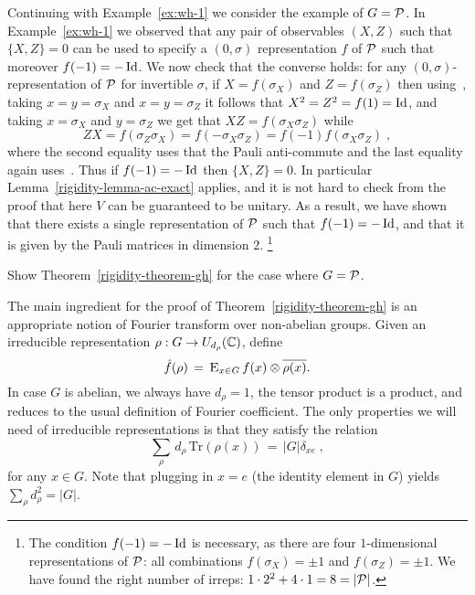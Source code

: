 \begin{example}
\label{ex:wh-3}
Continuing with Example~\ref{ex:wh-1} we consider the example of $G= \mathcal{P}$. In Example~\ref{ex:wh-1} we observed that any pair of observables $(X,Z)$ such that $\{X,Z\}=0$ can be used to specify a $(0,\sigma)$ representation $f$ of $\mathcal{P}$ such that moreover $f(-1)=-\mathop{\rm Id}\nolimits$. We now check that the converse holds: for any $(0,\sigma)$-representation of $\mathcal{P}$ for invertible $\sigma$, if $X=f(\sigma_X)$ and $Z=f(\sigma_Z)$ then using~, taking $x=y=\sigma_X$ and $x=y=\sigma_Z$ it follows that $X^2 = Z^2=f(1)=\mathop{\rm Id}\nolimits$, and taking $x=\sigma_X$ and $y=\sigma_Z$ we get that $XZ=f(\sigma_X \sigma_Z)$ while 
\[ZX=f(\sigma_Z\sigma_X)=f(-\sigma_X\sigma_Z)=f(-1)f(\sigma_X\sigma_Z)\;,\]
where the second equality uses that the Pauli anti-commute and the last equality again uses~. Thus if $f(-1)=-\mathop{\rm Id}\nolimits$ then 
 $\{X,Z\}=0$. In particular Lemma~\ref{rigidity-lemma-ac-exact} applies, and it is not hard to check from the proof that here $V$ can be guaranteed to be unitary. As a result, we have shown that there exists a single  representation of $\mathcal{P}$ such that $f(-1)=-\mathop{\rm Id}\nolimits$, and that it is given by the Pauli matrices in dimension $2$. 
\footnote{The condition $f(-1)=-\mathop{\rm Id}\nolimits$ is necessary, as there are four $1$-dimensional representations of $\mathcal{P}$: all combinations $f(\sigma_X)=\pm 1$ and $f(\sigma_Z)=\pm 1$. We have found the right number of irreps: $1\cdot 2^2 + 4\cdot 1 = 8 = |\mathcal{P}|$.}
\end{example}

\begin{exercise}
Show Theorem~\ref{rigidity-theorem-gh} for the case where $G=\mathcal{P}$. 
\end{exercise}

The main ingredient for the proof of Theorem~\ref{rigidity-theorem-gh} is an appropriate notion of Fourier transform over non-abelian groups. Given an irreducible representation $\rho: G \to U_{d_\rho}(\mathbb{C})$, define 
\begin{equation}\label{eq:fourier}
 \hat{f}(\rho) \,=\, \textsc{E}_{x\in G} \,f(x) \otimes \overline{\rho(x)}.
\end{equation}
In case $G$ is abelian, we always have $d_\rho=1$, the tensor product is a product, and  reduces to the usual definition of Fourier coefficient. The only properties we will need of irreducible representations is that they satisfy the relation
\begin{equation}
\label{eq:ortho}
\sum_\rho \,d_\rho\,\mathrm{Tr}(\rho(x)) \,=\, |G|\delta_{xe}\;,
\end{equation}
for any $x\in G$. Note that plugging in $x=e$ (the identity element in $G$) yields $\sum_\rho d_\rho^2= |G|$. 

